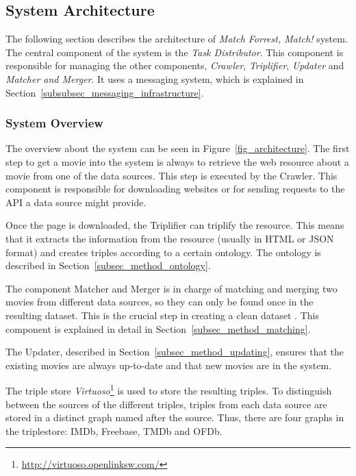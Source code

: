\subsection{System Architecture}
\label{subsec_method_architecture}

The following section describes the architecture of \emph{Match Forrest, Match!} system.
The central component of the system is the \textit{Task Distributor}.
This component is responsible for managing the other components, \textit{Crawler}, \textit{Triplifier}, \textit{Updater} and \textit{Matcher and Merger}.
It uses a messaging system, which is explained in Section~\ref{subsubsec_messaging_infrastructure}.

\subsubsection{System Overview}
\label{subsubsec_workflow}

The overview about the system can be seen in Figure~\ref{fig_architecture}.
The first step to get a movie into the system is always to retrieve the web resource about a movie from one of the data sources.
This step is executed by the Crawler.
This component is responsible for downloading websites or for sending requests to the API a data source might provide.

Once the page is downloaded, the Triplifier can triplify the resource.
This means that it extracts the information from the resource (usually in HTML or JSON format) and creates triples according to a certain ontology.
The ontology is described in Section~\ref{subsec_method_ontology}.

The component Matcher and Merger is in charge of matching and merging two movies from different data sources, so they can only be found once in the resulting dataset.
This is the crucial step in creating a clean dataset
.
This component is explained in detail in Section~\ref{subsec_method_matching}.

The Updater, described in Section~\ref{subsec_method_updating}, ensures that the existing movies are always up-to-date and that new movies are in the system.

The triple store \emph{Virtuoso}\footnote{\url{http://virtuoso.openlinksw.com/}} is used to store the resulting triples.
To distinguish between the sources of the different triples, triples from each data source are stored in a distinct graph named after the source.
Thus, there are four graphs in the triplestore: IMDb, Freebase, TMDb and OFDb.

